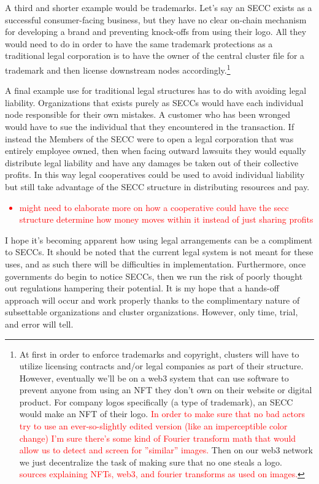 \documentclass{article}[10pt]
\begin{document}
A third and shorter example would be trademarks.
Let's say an SECC exists as a successful consumer-facing business, but they have no clear on-chain mechanism for developing a brand and preventing knock-offs from using their logo.
All they would need to do in order to have the same trademark protections as a traditional legal corporation is to have the owner of the central cluster file for a trademark and then license downstream nodes accordingly.\footnote{
    At first in order to enforce trademarks and copyright, clusters will have to utilize licensing contracts and/or legal companies as part of their structure.
    However, eventually we’ll be on a web3 system that can use software to prevent anyone from using an NFT they don't own on their website or digital product.
    For company logos specifically (a type of trademark), an SECC would make an NFT of their logo.
    \textcolor{red}{In order to make sure that no bad actors try to use an ever-so-slightly edited version (like an imperceptible color change) I’m sure there’s some kind of Fourier transform math that would allow us to detect and screen for ”similar” images.}
    Then on our web3 network we just decentralize the task of making sure that no one steals a logo.\\
    \textcolor{red}{sources explaining NFTs, web3, and fourier transforms as used on images.}}\par

A final example use for traditional legal structures has to do with avoiding legal liability.
Organizations that exists purely as SECCs would have each individual node responsible for their own mistakes.
A customer who has been wronged would have to sue the individual that they encountered in the transaction.
If instead the Members of the SECC were to open a legal corporation that was entirely employee owned, then when facing outward lawsuits they would equally distribute legal liability and have any damages be taken out of their collective profits.
In this way legal cooperatives could be used to avoid individual liability but still take advantage of the SECC structure in distributing resources and pay.\par
\textcolor{red}{\begin{itemize}
    \item might need to elaborate more on how a cooperative could have the secc structure determine how money moves within it instead of just sharing profits
\end{itemize}}

I hope it's becoming apparent how using legal arrangements can be a compliment to SECCs.
It should be noted that the current legal system is not meant for these uses, and as such there will be difficulties in implementation.
Furthermore, once governments do begin to notice SECCs, then we run the risk of poorly thought out regulations hampering their potential.
It is my hope that a hands-off approach will occur and work properly thanks to the complimentary nature of subsettable organizations and cluster organizations.
However, only time, trial, and error will tell.
\end{document}
